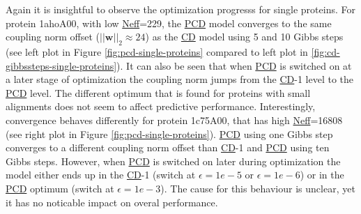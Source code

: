 \documentclass[11pt,a4paper,twoside]{book}
\newcommand{\eq}{\!=\!}
\newcommand{\w}{\mathbf{w}}
\theoremstyle{definition}
\theoremstyle{definition}
\theoremstyle{remark}
\begin{document}
Again it is insightful to observe the optimization progresss for single
proteins. For protein 1ahoA00, with low
\protect\hyperlink{abbrev}{Neff}=229, the
\protect\hyperlink{abbrev}{PCD} model converges to the same coupling
norm offset (\(||\w||_2 \approx 24\)) as the
\protect\hyperlink{abbrev}{CD} model using 5 and 10 Gibbs steps (see
left plot in Figure \ref{fig:pcd-single-proteins} compared to left plot
in \ref{fig:cd-gibbssteps-single-proteins}). It can also be seen that
when \protect\hyperlink{abbrev}{PCD} is switched on at a later stage of
optimization the coupling norm jumps from the
\protect\hyperlink{abbrev}{CD}-1 level to the
\protect\hyperlink{abbrev}{PCD} level. The different optimum that is
found for proteins with small alignments does not seem to affect
predictive performance. Interestingly, convergence behaves differently
for protein 1c75A00, that has high
\protect\hyperlink{abbrev}{Neff}=16808 (see right plot in Figure
\ref{fig:pcd-single-proteins}). \protect\hyperlink{abbrev}{PCD} using
one Gibbs step converges to a different coupling norm offset than
\protect\hyperlink{abbrev}{CD}-1 and \protect\hyperlink{abbrev}{PCD}
using ten Gibbs steps. However, when \protect\hyperlink{abbrev}{PCD} is
switched on later during optimization the model either ends up in the
\protect\hyperlink{abbrev}{CD}-1 (switch at \(\epsilon \eq 1e-5\) or
\(\epsilon \eq 1e-6\)) or in the \protect\hyperlink{abbrev}{PCD} optimum
(switch at \(\epsilon \eq 1e-3\)). The cause for this behaviour is
unclear, yet it has no noticable impact on overal performance.
\end{document}
